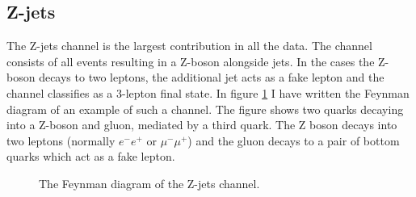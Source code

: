 \subsection{Z-jets}
The Z-jets channel is the largest contribution in all the data. The channel consists of all events
resulting in a Z-boson alongside jets. In the cases the Z-boson decays to two leptons, the additional 
jet acts as a fake lepton and the channel classifies as a 3-lepton final state. In figure \ref{fig:z_pjets} 
I have written the Feynman diagram of an example of such a channel. The figure shows two quarks decaying 
into a Z-boson and gluon, mediated by a third quark. The Z boson decays into two leptons (normally 
$e^-e^+$ or $\mu^- \mu^+$) and the gluon decays to a pair of bottom quarks which act as a fake lepton. 
\begin{figure}
    \centering
    \caption{The Feynman diagram of the  Z-jets channel.}
    \label{fig:z_pjets}
\end{figure}

